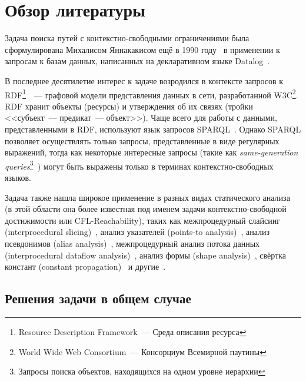 \section{Обзор литературы}\label{section:voda}

Задача поиска путей с контекстно-свободными ограничениями была сформулирована Михалисом Яннакакисом ещё в 1990 году~\cite{Yannakakis1990} в применении к запросам к базам данных, написанных на декларативном языке Datalog~\cite{DatalogWiki, Ceri1989}.

В последнее десятилетие интерес к задаче возродился в контексте запросов к RDF\footnote{Resource Description Framework~--- Среда описания ресурса}~\cite{RDF}~--- графовой модели представления данных в сети, разработанной W3C\footnote{World Wide Web Consortium~--- Консорциум Всемирной паутины}. RDF хранит объекты (ресурсы) и утверждения об их связях (тройки <<субъект~--- предикат~--- объект>>). Чаще всего для работы с данными, представленными в RDF, используют язык запросов SPARQL~\cite{SPARQL}. Однако SPARQL позволяет осуществлять только запросы, представленные в виде регулярных выражений, тогда как некоторые интересные запросы (такие как \textit{same-generation queries}\footnote{Запросы поиска объектов, находящихся на одном уровне иерархии}~\cite{Abiteboul1995}) могут быть выражены только в терминах контекстно-свободных языков.

Задача также нашла широкое применение в разных видах статического анализа~\cite{Reps1998} (в этой области она более известная под именем задачи контекстно-свободной достижимости или CFL-Reachability), таких как межпроцедурный слайсинг (inter\-procedural slicing)~\cite{Reps1994},  анализ указателей (points-to analysis)~\cite{Sridharan06, Xu09}, анализ псевдонимов (alias analysis)~\cite{Zheng08, Yan11, Zhang13}, межпроцедурный анализ потока данных (interprocedural dataflow analysis)~\cite{Rehof01,Pratikakis06}, анализ формы (shape analysis)~\cite{Reps1998, Rinetzky07}, свёртка констант (constant propagation)~\cite{Sagiv1996} и другие~\cite{Pratikakis06, Milanova14, Bastani15}.



\subsection{Решения задачи в общем случае}

